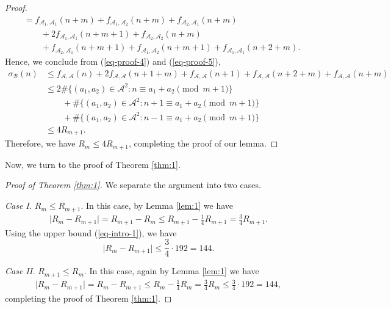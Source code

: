 \documentclass[12pt,a4paper,reqno]{amsart}
\numberwithin{equation}{section}
\theoremstyle{plain}
\theoremstyle{definition}
\begin{document}
\begin{proof}
\begin{align}
    &= f_{\mathcal{A}_{1},\mathcal{A}_{1}}(n+m)+f_{\mathcal{A}_{1},\mathcal{A}_{2}}(n+m)
    +f_{\mathcal{A}_{2},\mathcal{A}_{1}}(n+m)\nonumber\\
    &\quad \quad +2f_{\mathcal{A}_{1},\mathcal{A}_{1}}(n+m+1)+f_{\mathcal{A}_{2},\mathcal{A}_{2}}(n+m)\nonumber\\
    &\quad \quad +f_{\mathcal{A}_{2},\mathcal{A}_{1}}(n+m+1)+f_{\mathcal{A}_{1},\mathcal{A}_{2}}(n+m+1)+f_{\mathcal{A}_{1},\mathcal{A}_{1}}(n+2+m).
\end{align}
Hence, we conclude from (\ref{eq-proof-4}) and (\ref{eq-proof-5}),
\begin{align*}
    \sigma_{\mathcal{B}}(n)&\le f_{\mathcal{A},\mathcal{A}}(n)+2f_{\mathcal{A},\mathcal{A}}(n+1+m)+f_{\mathcal{A},\mathcal{A}}(n+1)+f_{\mathcal{A},\mathcal{A}}(n+2+m)+f_{\mathcal{A},\mathcal{A}}(n+m)\nonumber\\
    &\le2\#\big\{(a_1,a_2)\in \mathcal{A}^2: n\equiv a_1+a_2 \pmod{m+1}\big\}\nonumber\\
    &\quad \quad +\#\big\{(a_1,a_2)\in \mathcal{A}^2: n+1\equiv a_1+a_2\pmod{m+1}\big\}\nonumber\\
    &\quad \quad +\#\big\{(a_1,a_2)\in \mathcal{A}^2: n-1\equiv a_1+a_2\pmod{m+1}\big\}\nonumber\\
    &\le 4R_{m+1}.
\end{align*}
Therefore, we have $R_{m}\le 4 R_{m+1}$, completing the proof of our lemma.
 \end{proof}

Now, we turn to the proof of Theorem \ref{thm:1}.

\begin{proof}[Proof of Theorem \ref{thm:1}]

    We separate the argument into two cases.

    {\it Case I.} $R_m\le R_{m+1}$. In this case, by Lemma \ref{lem:1} we have
    \begin{align*}
        \big| R_m-R_{m+1}\big|=R_{m+1}-R_m\le R_{m+1}-\frac{1}{4}R_{m+1}=\frac{3}{4}R_{m+1}.
    \end{align*}
    Using the upper bound (\ref{eq-intro-1}), we have
    $$
    \big| R_m-R_{m+1}\big|\le \frac{3}{4}\cdot 192=144.
    $$

    {\it Case II.} $R_{m+1}\le R_{m}$. In this case, again by Lemma \ref{lem:1} we have
    \begin{align*}
        \big| R_m-R_{m+1}\big|=R_{m}-R_{m+1}\le R_{m}-\frac{1}{4}R_{m}=\frac{3}{4}R_{m}\le \frac{3}{4}\cdot 192=144,
    \end{align*}
    completing the proof of Theorem \ref{thm:1}.
\end{proof}
\end{document}
